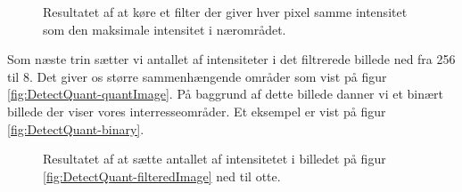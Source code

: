 \begin{figure}[htp]
  \centering
  \caption{Resultatet af at køre et filter der giver hver pixel samme intensitet som den maksimale intensitet i nærområdet.}
  \label{fig:DetectQuant-filteredImage}  
\end{figure}

Som næste trin sætter vi antallet af intensiteter i det filtrerede billede ned fra 256 til 8. Det giver os større sammenhængende områder som vist på figur \vref{fig:DetectQuant-quantImage}. På baggrund af dette billede danner vi et binært billede der viser vores interresseområder. Et eksempel er vist på figur \vref{fig:DetectQuant-binary}.

\begin{figure}[htp]
  \centering
  \caption{Resultatet af at sætte antallet af intensitetet i billedet på figur \vref{fig:DetectQuant-filteredImage} ned til otte.}
  \label{fig:DetectQuant-quantImage}  
\end{figure}

